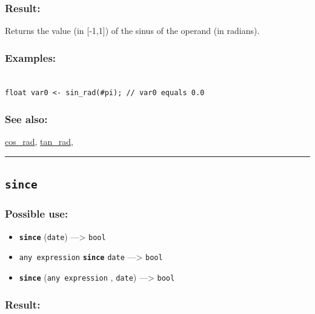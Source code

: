 \documentclass[]{book}
\providecommand{\tightlist}{%
  \setlength{\itemsep}{0pt}\setlength{\parskip}{0pt}}
\theoremstyle{definition}
\theoremstyle{definition}
\theoremstyle{definition}
\theoremstyle{remark}
\begin{document}
\subsubsection{Result:}\label{result-461}

Returns the value (in {[}-1,1{]}) of the sinus of the operand (in
radians).

\subsubsection{Examples:}\label{examples-333}

\begin{verbatim}
 
float var0 <- sin_rad(#pi); // var0 equals 0.0
\end{verbatim}

\subsubsection{See also:}\label{see-also-186}

\href{operators-b-to-c.html\#cos_rad}{cos\_rad},
\href{operators-s-to-z.html\#tan_rad}{tan\_rad},

\begin{center}\rule{0.5\linewidth}{\linethickness}\end{center}

\subsection{\texorpdfstring{\texttt{since}}{since}}\label{since}

\subsubsection{Possible use:}\label{possible-use-478}

\begin{itemize}
\tightlist
\item
  \textbf{\texttt{since}} (\texttt{date}) ---\textgreater{}
  \texttt{bool}
\item
  \texttt{any\ expression} \textbf{\texttt{since}} \texttt{date}
  ---\textgreater{} \texttt{bool}
\item
  \textbf{\texttt{since}} (\texttt{any\ expression} , \texttt{date})
  ---\textgreater{} \texttt{bool}
\end{itemize}

\subsubsection{Result:}\label{result-462}
\end{document}
